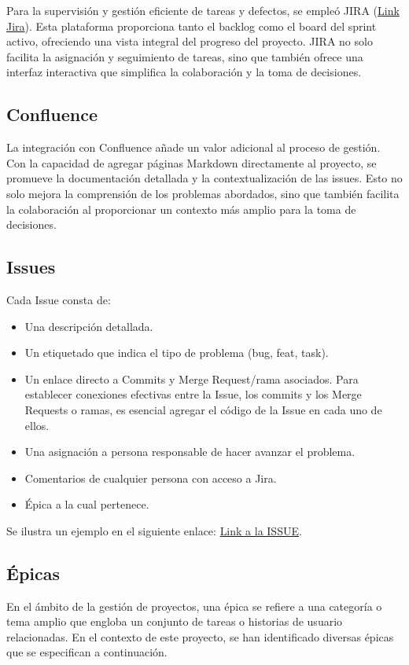 Para la supervisión y gestión eficiente de tareas y defectos, se empleó JIRA (\href{https://prietojulii.atlassian.net/jira/software/projects/PAT/boards/1}{Link Jira}). Esta plataforma proporciona tanto el backlog como el board del sprint activo, ofreciendo una vista integral del progreso del proyecto. JIRA no solo facilita la asignación y seguimiento de tareas, sino que también ofrece una interfaz interactiva que simplifica la colaboración y la toma de decisiones. 

\subsection{Confluence}
La integración con Confluence añade un valor adicional al proceso de gestión. Con la capacidad de agregar páginas Markdown directamente al proyecto, se promueve la documentación detallada y la contextualización de las issues. Esto no solo mejora la comprensión de los problemas abordados, sino que también facilita la colaboración al proporcionar un contexto más amplio para la toma de decisiones.

\subsection{Issues}
Cada Issue consta de:
\begin{itemize}
    \item Una descripción detallada.
    \item Un etiquetado que indica el tipo de problema (bug, feat, task).
    \item Un enlace directo a Commits y Merge Request/rama asociados. Para establecer conexiones efectivas entre la Issue, los commits y los Merge Requests o ramas, es esencial agregar el código de la Issue en cada uno de ellos.
    \item Una asignación a persona responsable de hacer avanzar el problema.
    \item Comentarios de cualquier persona con acceso a Jira.
    \item Épica a la cual pertenece.
\end{itemize}
Se ilustra un ejemplo en el siguiente enlace: \href{https://prietojulii.atlassian.net/browse/PAT-44}{Link a la ISSUE}.

\subsection{Épicas}
En el ámbito de la gestión de proyectos, una épica se refiere a una categoría o tema amplio que engloba un conjunto de tareas o historias de usuario relacionadas.
En el contexto de este proyecto, se han identificado diversas épicas que se especifican a continuación.


